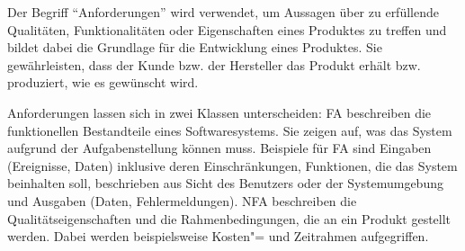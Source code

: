 Der Begriff \enquote{Anforderungen} wird verwendet, um Aussagen über zu erfüllende Qualitäten, Funktionalitäten oder Eigenschaften eines Produktes zu treffen und bildet dabei die Grundlage für die Entwicklung eines Produktes.
Sie gewährleisten, dass der Kunde bzw. der Hersteller das Produkt erhält bzw. produziert, wie es gewünscht wird.\unskip{}

Anforderungen lassen sich in zwei Klassen unterscheiden:
\ac{FA} beschreiben die funktionellen Bestandteile eines Softwaresystems.
Sie zeigen auf, was das System aufgrund der Aufgabenstellung können muss.
Beispiele für \ac{FA} sind Eingaben (Ereignisse, Daten) inklusive deren Einschränkungen, Funktionen, die das System beinhalten soll, beschrieben aus Sicht des Benutzers oder der Systemumgebung und Ausgaben (Daten, Fehlermeldungen).
\ac{NFA} beschreiben die Qualitätseigenschaften und die Rahmenbedingungen, die an ein Produkt gestellt werden.
Dabei werden beispielsweise Kosten"= und Zeitrahmen aufgegriffen.


